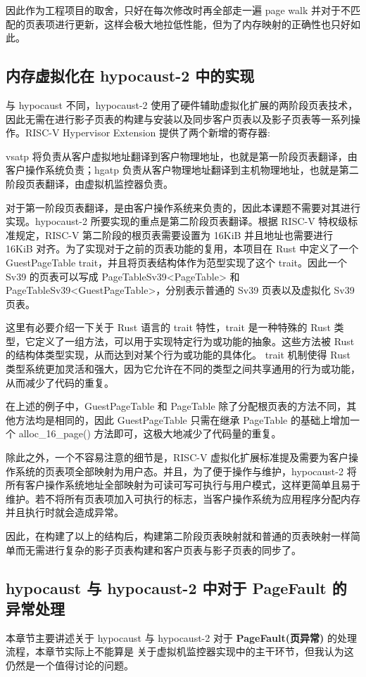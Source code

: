 因此作为工程项目的取舍，只好在每次修改时再全部走一遍 page walk 并对于不匹配的页表项进行更新，这样会极大地拉低性能，但为了内存映射的正确性也只好如此。

\subsection{内存虚拟化在 hypocaust-2 中的实现}
与 hypocaust 不同，hypocaust-2 使用了硬件辅助虚拟化扩展的两阶段页表技术，因此无需在进行影子页表的构建与安装以及同步客户页表以及影子页表等一系列操作。RISC-V Hypervisor Extension 提供了两个新增的寄存器: 

vsatp 将负责从客户虚拟地址翻译到客户物理地址，也就是第一阶段页表翻译，由客户操作系统负责；hgatp 负责从客户物理地址翻译到主机物理地址，也就是第二阶段页表翻译，由虚拟机监控器负责。

对于第一阶段页表翻译，是由客户操作系统来负责的，因此本课题不需要对其进行实现。hypocaust-2 所要实现的重点是第二阶段页表翻译。根据 RISC-V 特权级标准规定，RISC-V 第二阶段的根页表需要设置为 16KiB 并且地址也需要进行 16KiB 对齐。为了实现对于之前的页表功能的复用，本项目在 Rust 中定义了一个 GuestPageTable trait，并且将页表结构体作为范型实现了这个 trait。因此一个 Sv39 的页表可以写成 PageTableSv39<PageTable> 和 PageTableSv39<GuestPageTable>，分别表示普通的 Sv39 页表以及虚拟化 Sv39 页表。

这里有必要介绍一下关于 Rust 语言的 trait 特性，trait 是一种特殊的 Rust 类型，它定义了一组方法，可以用于实现特定行为或功能的抽象。这些方法被 Rust 的结构体类型实现，从而达到对某个行为或功能的具体化。
trait 机制使得 Rust 类型系统更加灵活和强大，因为它允许在不同的类型之间共享通用的行为或功能，从而减少了代码的重复。  
  
在上述的例子中，GuestPageTable 和 PageTable 除了分配根页表的方法不同，其他方法均是相同的，因此 GuestPageTable 只需在继承 PageTable 的基础上增加一个 alloc\_16\_page() 方法即可，这极大地减少了代码量的重复。

除此之外，一个不容易注意的细节是，RISC-V 虚拟化扩展标准提及需要为客户操作系统的页表项全部映射为用户态。并且，为了便于操作与维护，hypocaust-2 将所有客户操作系统地址全部映射为可读可写可执行与用户模式，这样更简单且易于维护。若不将所有页表项加入可执行的标志，当客户操作系统为应用程序分配内存并且执行时就会造成异常。

因此，在构建了以上的结构后，构建第二阶段页表映射就和普通的页表映射一样简单而无需进行复杂的影子页表构建和客户页表与影子页表的同步了。

\subsection{hypocaust 与 hypocaust-2 中对于 PageFault 的异常处理}
本章节主要讲述关于 hypocaust 与 hypocaust-2 对于 \textbf{PageFault(页异常)} 的处理流程，本章节实际上不能算是
关于虚拟机监控器实现中的主干环节，但我认为这仍然是一个值得讨论的问题。

